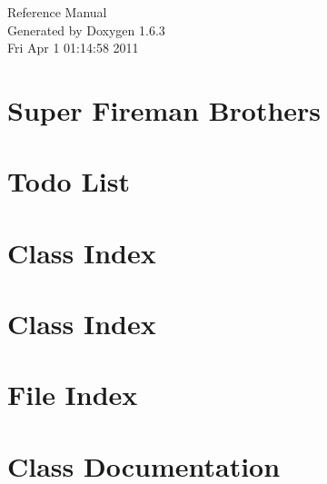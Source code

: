 \documentclass[a4paper]{book}
\begin{document}
\hypersetup{pageanchor=false}
\begin{titlepage}
\vspace*{7cm}
\begin{center}
{\Large Reference Manual}\\
\vspace*{1cm}
{\large Generated by Doxygen 1.6.3}\\
\vspace*{0.5cm}
{\small Fri Apr 1 01:14:58 2011}\\
\end{center}
\end{titlepage}
\clearemptydoublepage
{}
\tableofcontents
\clearemptydoublepage
{}
\hypersetup{pageanchor=true}
\chapter{Super Fireman Brothers}
\label{index}\hypertarget{index}{}
\chapter{Todo List}
\label{todo}
\hypertarget{todo}{}

\chapter{Class Index}

\chapter{Class Index}

\chapter{File Index}

\chapter{Class Documentation}


















\end{document}
